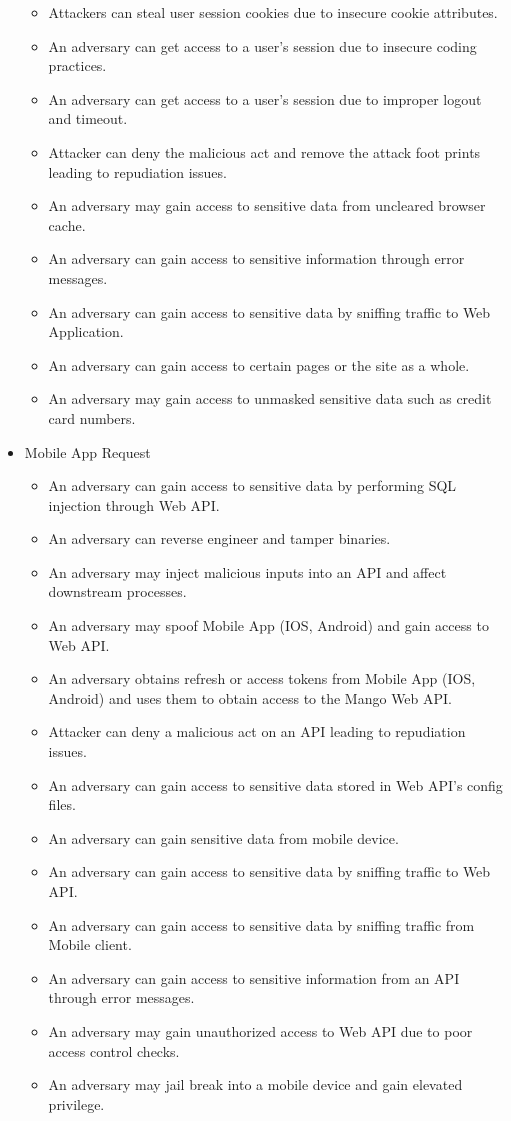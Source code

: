 \begin{itemize}
\begin{itemize}
        \item Attackers can steal user session cookies due to insecure cookie attributes.
        \item An adversary can get access to a user's session due to insecure coding practices.
        \item An adversary can get access to a user's session due to improper logout and timeout.
        \item Attacker can deny the malicious act and remove the attack foot prints leading to repudiation issues.
        \item An adversary may gain access to sensitive data from uncleared browser cache.
        \item An adversary can gain access to sensitive information through error messages.
        \item An adversary can gain access to sensitive data by sniffing traffic to Web Application.
        \item An adversary can gain access to certain pages or the site as a whole.
        \item An adversary may gain access to unmasked sensitive data such as credit card numbers.
    \end{itemize}
    \item Mobile App Request
    \begin{itemize}
        \item An adversary can gain access to sensitive data by performing SQL injection through Web API.
        \item An adversary can reverse engineer and tamper binaries.
        \item An adversary may inject malicious inputs into an API and affect downstream processes.
        \item An adversary may spoof Mobile App (IOS, Android) and gain access to Web API\@.
        \item An adversary obtains refresh or access tokens from Mobile App (IOS, Android) and uses them to
        obtain access to the Mango Web API\@.
        \item Attacker can deny a malicious act on an API leading to repudiation issues.
        \item An adversary can gain access to sensitive data stored in Web API's config files.
        \item An adversary can gain sensitive data from mobile device.
        \item An adversary can gain access to sensitive data by sniffing traffic to Web API\@.
        \item An adversary can gain access to sensitive data by sniffing traffic from Mobile client.
        \item An adversary can gain access to sensitive information from an API through error messages.
        \item An adversary may gain unauthorized access to Web API due to poor access control checks.
        \item An adversary may jail break into a mobile device and gain elevated privilege.
    \end{itemize}
\end{itemize}